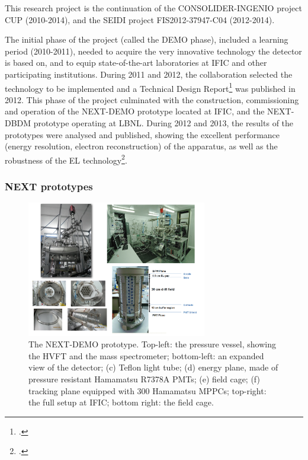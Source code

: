 
%

This research project is the continuation of the CONSOLIDER-INGENIO project CUP (2010-2014), and the SEIDI project FIS2012-37947-C04 (2012-2014). 

The initial phase of the project (called the DEMO phase), included a learning period (2010-2011), needed to acquire the very innovative technology the detector is based on, and to equip state-of-the-art laboratories at IFIC and other participating institutions. 
During 2011 and 2012, the collaboration selected the technology to be implemented and a Technical Design Report\footcite{Alvarez:2012haa} was published in 2012. This phase of the project culminated  with the construction, commissioning and operation of the NEXT-DEMO prototype located at IFIC, and the NEXT-DBDM prototype operating at LBNL. During 2012 and 2013, the results of the prototypes were analysed and published, showing the excellent performance (energy resolution, electron reconstruction) of the apparatus, as well as the robustness of the EL technology\footcite{Alvarez:2012hh, Alvarez:2012nd, Alvarez:2012hu}. 

\subsubsection*{NEXT prototypes}

\begin{figure}
\centering
\includegraphics[width=0.7\textwidth]{img/DemoSetup2.png}
\caption{\small The NEXT-DEMO prototype. Top-left: the pressure vessel, showing the HVFT and the mass spectrometer; bottom-left: an expanded view of the detector; (c) Teflon light tube; (d) energy plane, made of pressure resistant Hamamatsu R7378A PMTs; (e) field cage; (f) tracking plane equipped with 300 Hamamatsu MPPCs; top-right: the full setup at IFIC; bottom right: the field cage.} \label{fig.DEMO}
\end{figure}

